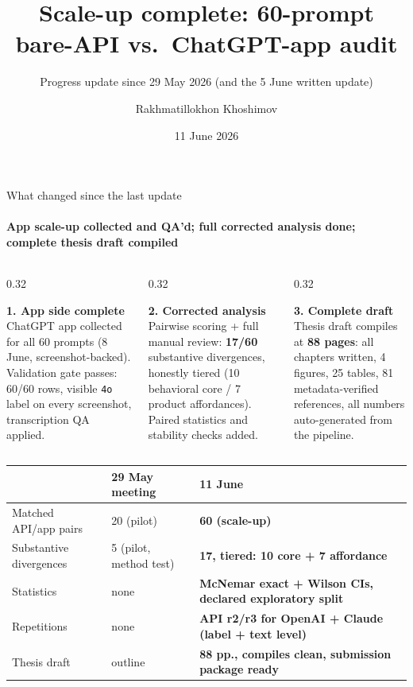 \documentclass[aspectratio=169,onlytextwidth]{beamer}
\title{Scale-up complete: 60-prompt bare-API vs.\ ChatGPT-app audit}
\subtitle{Progress update since 29 May 2026 (and the 5 June written update)}
\author{Rakhmatillokhon Khoshimov}
\date{11 June 2026}
\institute{Department of Informatics \\ Social Computing Group}
\newcommand{\oktext}[1]{\textbf{#1}}
\begin{document}
\maketitle

\begin{frame}[shrink=10]{What changed since the last update}
\framesubtitle{App scale-up collected and QA'd; full corrected analysis done; complete thesis draft compiled}
\begin{columns}[T,totalwidth=\textwidth]
\begin{column}{0.32\textwidth}
\begin{block}{\oktext{1. App side complete}}
\small ChatGPT app collected for all 60 prompts (8 June, screenshot-backed). Validation gate passes: 60/60 rows, visible \texttt{4o} label on every screenshot, transcription QA applied.
\end{block}
\end{column}
\begin{column}{0.32\textwidth}
\begin{block}{\oktext{2. Corrected analysis}}
\small Pairwise scoring + full manual review: \textbf{17/60} substantive divergences, honestly tiered (10 behavioral core / 7 product affordances). Paired statistics and stability checks added.
\end{block}
\end{column}
\begin{column}{0.32\textwidth}
\begin{block}{\oktext{3. Complete draft}}
\small Thesis draft compiles at \textbf{88 pages}: all chapters written, 4 figures, 25 tables, 81 metadata-verified references, all numbers auto-generated from the pipeline.
\end{block}
\end{column}
\end{columns}
\vspace{0.2cm}
\small
\begin{tabular}{lll}
\toprule
& \textbf{29 May meeting} & \textbf{11 June} \\
\midrule
Matched API/app pairs & 20 (pilot) & \textbf{60 (scale-up)} \\
Substantive divergences & 5 (pilot, method test) & \textbf{17, tiered: 10 core + 7 affordance} \\
Statistics & none & \textbf{McNemar exact + Wilson CIs, declared exploratory split} \\
Repetitions & none & \textbf{API r2/r3 for OpenAI + Claude (label + text level)} \\
Thesis draft & outline & \textbf{88 pp., compiles clean, submission package ready} \\
\bottomrule
\end{tabular}
\end{frame}
\end{document}
